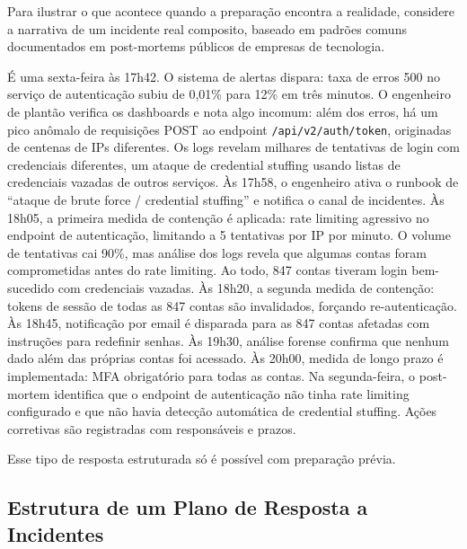 Para ilustrar o que acontece quando a preparação encontra a realidade, considere
a narrativa de um incidente real composito, baseado em padrões comuns
documentados em post-mortems públicos de empresas de tecnologia.

É uma sexta-feira às 17h42. O sistema de alertas dispara: taxa de erros 500 no
serviço de autenticação subiu de 0,01\% para 12\% em três minutos. O engenheiro
de plantão verifica os dashboards e nota algo incomum: além dos erros, há um
pico anômalo de requisições POST ao endpoint \texttt{/api/v2/auth/token},
originadas de centenas de IPs diferentes. Os logs revelam milhares de tentativas
de login com credenciais diferentes, um ataque de credential stuffing usando
listas de credenciais vazadas de outros serviços. Às 17h58, o engenheiro ativa o
runbook de ``ataque de brute force / credential stuffing'' e notifica o canal de
incidentes. Às 18h05, a primeira medida de contenção é aplicada: rate limiting
agressivo no endpoint de autenticação, limitando a 5 tentativas por IP por
minuto. O volume de tentativas cai 90\%, mas análise dos logs revela que algumas
contas foram comprometidas antes do rate limiting. Ao todo, 847 contas tiveram login
bem-sucedido com credenciais vazadas. Às 18h20, a segunda medida de contenção:
tokens de sessão de todas as 847 contas são invalidados, forçando re-autenticação.
Às 18h45, notificação por email é disparada para as 847 contas afetadas com
instruções para redefinir senhas. Às 19h30, análise forense confirma que nenhum
dado além das próprias contas foi acessado. Às 20h00, medida de longo prazo é
implementada: MFA obrigatório para todas as contas. Na segunda-feira, o
post-mortem identifica que o endpoint de autenticação não tinha rate limiting
configurado e que não havia detecção automática de credential stuffing. Ações
corretivas são registradas com responsáveis e prazos.

Esse tipo de resposta estruturada só é possível com preparação prévia.

\subsection{Estrutura de um Plano de Resposta a Incidentes}

